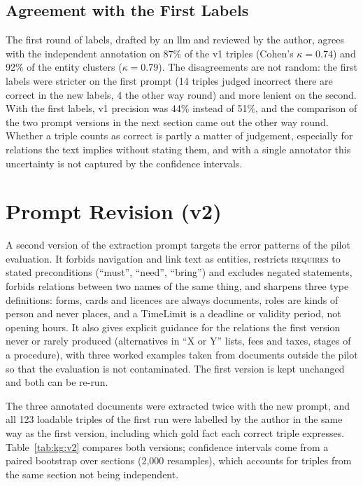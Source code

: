 \subsection{Agreement with the First Labels}

The first round of labels, drafted by an \gls{llm} and reviewed by the author, agrees
with the independent annotation on 87\% of the v1 triples (Cohen's $\kappa = 0.74$) and
92\% of the entity clusters ($\kappa = 0.79$). The disagreements are not random: the
first labels were stricter on the first prompt (14 triples judged incorrect there are
correct in the new labels, 4 the other way round) and more lenient on the second. With
the first labels, v1 precision was 44\% instead of 51\%, and the comparison of the two
prompt versions in the next section came out the other way round. Whether a triple counts
as correct is partly a matter of judgement, especially for relations the text implies
without stating them, and with a single annotator this uncertainty is not captured by
the confidence intervals.


\section{Prompt Revision (v2)}\label{sec:kg:v2}

A second version of the extraction prompt targets the error patterns of the pilot
evaluation. It forbids navigation and link text as entities, restricts
\textsc{requires} to stated preconditions (``must'', ``need'', ``bring'') and excludes
negated statements, forbids relations between two names of the same thing, and
sharpens three type definitions: forms, cards and licences are always documents, roles
are kinds of person and never places, and a TimeLimit is a deadline or validity
period, not opening hours. It also gives explicit guidance for the relations the first
version never or rarely produced (alternatives in ``X or Y'' lists, fees and taxes,
stages of a procedure), with three worked examples taken from documents outside the
pilot so that the evaluation is not contaminated. The first version is kept unchanged
and both can be re-run.

The three annotated documents were extracted twice with the new prompt, and all 123
loadable triples of the first run were labelled by the author in the same way as the
first version, including which gold fact each correct triple expresses.
Table~\ref{tab:kg:v2} compares both versions; confidence intervals come from a paired
bootstrap over sections (2{,}000 resamples), which accounts for triples from the same
section not being independent.

